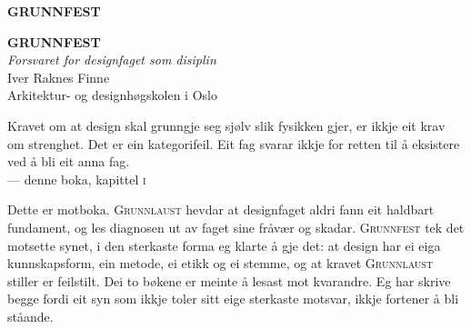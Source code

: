 \documentclass[11pt,twoside,openright]{book}
\renewcommand{\normalsize}{\fontsize{11}{15.5}\selectfont}
\begin{document}
\frontmatter
\pagestyle{empty}

\vspace*{\fill}\begin{center}{\fontsize{30}{32}\selectfont\bfseries GRUNNFEST}\end{center}\vspace*{\fill}\clearpage

\thispagestyle{empty}\vspace*{\fill}
\begin{center}
  {\fontsize{52}{54}\selectfont\bfseries GRUNNFEST}\\[10mm]
  {\large\itshape Forsvaret for designfaget som disiplin}\\[30mm]
  {\normalsize Iver Raknes Finne}\\[2mm]
  {\footnotesize Arkitektur- og designhøgskolen i Oslo\quad\textperiodcentered{}}
\end{center}
\vspace*{\fill}\clearpage

\thispagestyle{empty}\vspace*{\fill}
\begin{flushright}\itshape\small\begin{minipage}{0.76\linewidth}\raggedleft
Kravet om at design skal grunngje seg sjølv slik fysikken gjer, er ikkje eit krav om strenghet. Det er ein kategorifeil. Eit fag svarar ikkje for retten til å eksistere ved å bli eit anna fag.\\[3mm]
\upshape\footnotesize — denne boka, kapittel \textsc{i}
\end{minipage}\end{flushright}
\vspace*{\fill}\clearpage

\thispagestyle{empty}\vspace*{6mm}
\noindent\small Dette er motboka. \textsc{Grunnlaust} hevdar at designfaget aldri fann eit haldbart fundament, og les diagnosen ut av faget sine fråvær og skadar. \textsc{Grunnfest} tek det motsette synet, i den sterkaste forma eg klarte å gje det: at design har ei eiga kunnskapsform, ein metode, ei etikk og ei stemme, og at kravet \textsc{Grunnlaust} stiller er feilstilt. Dei to bøkene er meinte å lesast mot kvarandre. Eg har skrive begge fordi eit syn som ikkje toler sitt eige sterkaste motsvar, ikkje fortener å bli ståande.
\clearpage

\pagestyle{plain}
{\small\renewcommand{\contentsname}{}\vspace*{4mm}{\scshape\addfontfeature{LetterSpace=6}\normalsize innhald}\par\vspace{4mm}\tableofcontents}
\clearpage
\end{document}
